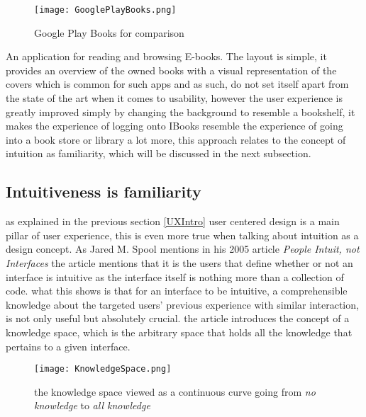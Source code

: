 \begin{figure}[H]
\centering
\texttt{[image: GooglePlayBooks.png]}
\caption{Google Play Books for comparison}
\end{figure}
An application for reading and browsing E-books. The layout is simple, it provides an overview of the owned books with a visual representation of the covers which is common for such apps and as such, do not set itself apart from the state of the art when it comes to usability, however the user experience is greatly improved simply by changing the background to resemble a bookshelf, it makes the experience of logging onto IBooks resemble the experience of going into a book store or library a lot more, this approach relates to the concept of intuition as familiarity, which will be discussed in the next subsection.   



\subsection{Intuitiveness is familiarity}
as explained in the previous section \ref{UXIntro} user centered design is a main pillar of user experience, this is even more true when talking about intuition as a design concept. As Jared M. Spool mentions in his 2005 article \textit{People Intuit, not Interfaces}\cite{JaredMSpool} the article mentions that it is the users that define whether or not an interface is intuitive as the interface itself is nothing more than a collection of code. what this shows is that for an interface to be intuitive, a comprehensible knowledge about the targeted users' previous experience with similar interaction, is not only useful but absolutely crucial. the article introduces the concept of a knowledge space, which is the arbitrary space that holds all the knowledge that pertains to a given interface. 

\begin{figure}[H]
\centering 
\texttt{[image: KnowledgeSpace.png]}
\caption{the knowledge space viewed as a continuous curve going from \textit{no knowledge} to \textit{all knowledge} \cite{JaredMSpool}}
\label{fig:Knowledge}
\end{figure}

